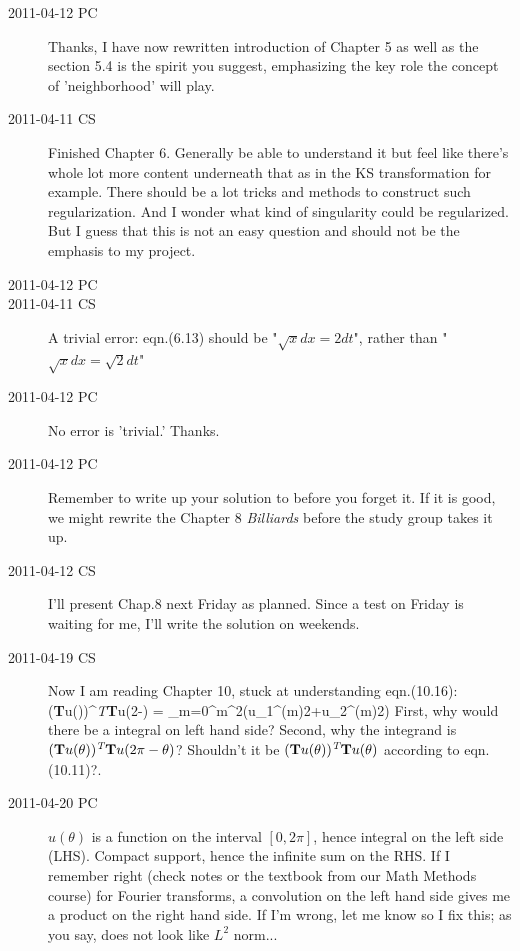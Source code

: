 \begin{description}
\item[2011-04-12 PC] Thanks, I have now rewritten introduction of
Chapter 5 as well as the section 5.4 is the spirit you suggest,
emphasizing the key role the concept of 'neighborhood' will play.

\item[2011-04-11 CS]
Finished Chapter 6. Generally be able to understand it but feel like there's whole lot more content underneath that as in the KS transformation for example. There should be a lot tricks and methods to construct such regularization. And I wonder what kind of singularity could be regularized. But I guess that this is not an easy question and should not be the emphasis to my project.

\item[2011-04-12 PC]

\item[2011-04-11 CS]
A trivial error: eqn.(6.13) should be "$\sqrt{x}dx = 2dt$",
rather than "$\sqrt{x}dx = \sqrt{2}dt$"

\item[2011-04-12 PC]
No error is 'trivial.' Thanks.

\item[2011-04-12 PC] Remember to write up your solution to
 before you forget it. If it is good, we might
rewrite the Chapter 8 {\em Billiards} before the study group takes it up.

\item[2011-04-12 CS] I'll present Chap.8 next Friday as planned. Since a test on Friday is waiting for me, I'll write the solution on weekends.

\item[2011-04-19 CS] Now I am reading Chapter 10, stuck at understanding eqn.(10.16):\\\nonumber
\beq
\oint{}(\textbf{T}u(\theta))^{\emph{T}}\textbf{T}u(2\pi-\theta)
 = \sum\limits_{m=0}^{\infty}m^{2}(u_{1}^{(m)2}+u_{2}^{(m)2})
\eeq
First, why would there be a integral on left hand side?
Second, why the integrand is $(\textbf{T}u(\theta))^{\emph{T}}\textbf{T}u(2\pi-\theta)$? Shouldn't it be
 $(\textbf{T}u(\theta))^{\emph{T}}\textbf{T}u(\theta)$ according to eqn.(10.11)?.

\item[2011-04-20 PC] $u(\theta)$ is a function on the interval $[0,2\pi]$,
hence integral on the left side (LHS). Compact support, hence the infinite sum
on the RHS. If I remember right (check notes or the textbook from
our Math Methods course) for Fourier transforms, a convolution on the
left hand side gives me a product on the right hand side. If I'm wrong,
let me know so I fix this; as you say, does not look like $L^2$ norm...


\end{description}

